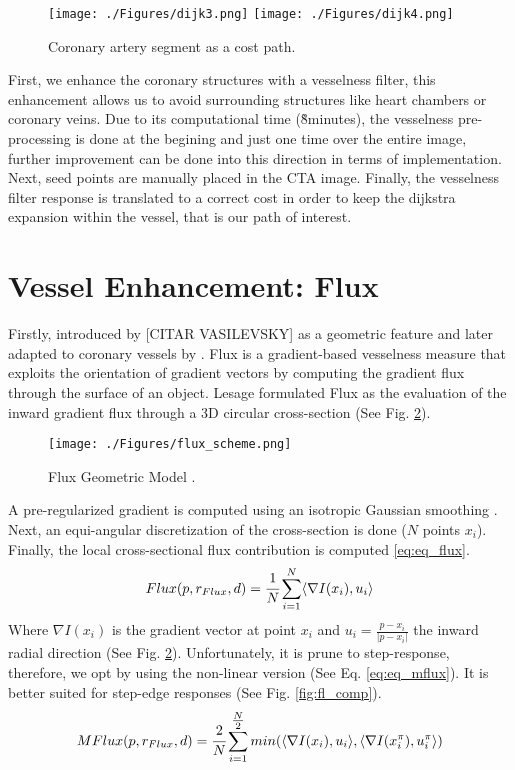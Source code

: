 \begin{figure}[ht]
	\centering
		\texttt{[image: ./Figures/dijk3.png]}
		\texttt{[image: ./Figures/dijk4.png]}
	\caption[Coronary Artery Segment as a Cost Path]{Coronary artery segment as a cost path.}
	\label{fig:dijk3_vs_dijk4}
\end{figure}

First, we enhance the coronary structures with a vesselness filter, this enhancement allows us to avoid surrounding structures like heart chambers or coronary veins. Due to its computational time (\~8minutes), the vesselness pre-processing is done at the begining and just one time over the entire image, further improvement can be done into this direction in terms of implementation.
Next, seed points are manually placed in the CTA image. Finally, the vesselness filter response is translated to a correct cost in order to keep the dijkstra expansion within the vessel, that is our path of interest.

\section{Vessel Enhancement: Flux}\label{cent:flu}

Firstly, introduced by [CITAR VASILEVSKY] as a geometric feature and later adapted to coronary vessels by \citep{Lesage2009a}. Flux is a gradient-based vesselness measure that exploits the orientation of gradient vectors by computing the gradient flux through the surface of an object. Lesage formulated Flux as the evaluation of the inward gradient flux through a 3D circular cross-section (See Fig. \ref{fig:fl_sch}).

\begin{figure}[ht]
	\centering
		\texttt{[image: ./Figures/flux\_scheme.png]}
	\caption[Flux Geometric Model]{Flux Geometric Model \citep{Lesage2009a}.}
	\label{fig:fl_sch}
\end{figure}

A pre-regularized gradient is computed using an isotropic Gaussian smoothing \citep{Deriche1993}. Next, an  equi-angular discretization of the cross-section is done ($N$ points $x_i$). Finally, the local cross-sectional flux contribution is computed \ref{eq:eq_flux}.
\begin{equation}
\label{eq:eq_flux}
Flux( p, r_{Flux}, d) = \cfrac{1}{N} \sum\limits_{i=1}^N \langle \nabla I(x_{i}),u_{i} \rangle 
\end{equation}
Where $\nabla I(x_{i})$ is the gradient vector at point $x_i$ and $u_{i}=\tfrac{p-x_i}{\vert p-x_i\vert} $ the inward radial direction (See Fig. \ref{fig:fl_sch}). Unfortunately, it is prune to step-response, therefore, we opt by using the non-linear version (See Eq. \ref{eq:eq_mflux}). It is better suited for step-edge responses (See Fig. \ref{fig:fl_comp}).
\begin{equation}
\label{eq:eq_mflux}
MFlux( p, r_{Flux}, d) = \cfrac{2}{N} \sum\limits_{i=1}^{\tfrac{N}{2}} min(\langle \nabla I(x_{i}),u_{i} \rangle,\langle \nabla I(x_{i}^{\pi}),u_{i}^{\pi} \rangle )
\end{equation}


